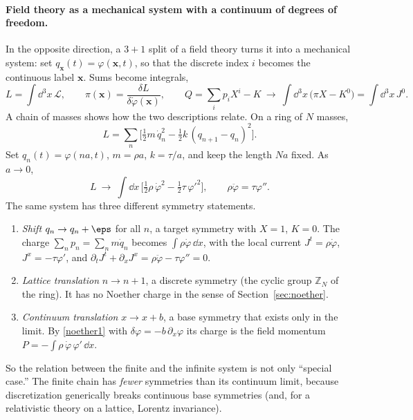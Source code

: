 \paragraph{Field theory as a mechanical system with a continuum of degrees of
freedom.}
In the opposite direction, a $3{+}1$ split of a field theory turns it into a
mechanical system: set $q_{{\bm{x}}}(t)=\varphi({\bm{x}},t)$, so that the discrete index
$i$ becomes the continuous label ${\bm{x}}$. Sums become integrals,
\begin{equation}
  L=\int\dd^3x\,\mathcal L,\qquad
  \pi({\bm{x}})=\frac{\delta L}{\delta\dot\varphi({\bm{x}})},\qquad
  Q=\sum_ip_iX^i-K\ \longrightarrow\ \int\dd^3x\,\big(\pi X-K^0\big)=\int\dd^3x\,J^0 .
\end{equation}
A chain of masses shows how the two descriptions relate. On a ring of $N$
masses,
\begin{equation}
  L=\sum_{n}\Big[\tfrac12m\,\dot q_n^2-\tfrac12k\,(q_{n+1}-q_n)^2\Big].
\end{equation}
Set $q_n(t)=\varphi(na,t)$, $m=\rho a$, $k=\tau/a$, and keep the length $Na$
fixed. As $a\to0$,
\begin{equation}
  L\ \to\ \int\dd x\,\Big[\tfrac12\rho\,\dot\varphi^2-\tfrac12\tau\,\varphi'^2\Big],
  \qquad\rho\ddot\varphi=\tau\varphi'' .
\end{equation}
The same system has three different symmetry statements.
\begin{enumerate}[leftmargin=1.8em,itemsep=3pt,label=\textbf{\arabic*.}]
\item \emph{Shift} $q_n\to q_n+\eps$ for all $n$, a target symmetry with $X=1$,
  $K=0$. The charge $\sum_np_n=\sum_nm\dot q_n$ becomes $\int\rho\dot\varphi\,\dd x$,
  with the local current $J^t=\rho\dot\varphi$, $J^x=-\tau\varphi'$, and
  $\partial_tJ^t+\partial_xJ^x=\rho\ddot\varphi-\tau\varphi''=0$.
\item \emph{Lattice translation} $n\to n+1$, a discrete symmetry (the cyclic group
  $\mathbb Z_N$ of the ring). It has no Noether charge in the sense of
  Section~\ref{sec:noether}.
\item \emph{Continuum translation} $x\to x+b$, a base symmetry that exists only
  in the limit. By \eqref{noether1} with $\delta\varphi=-b\,\partial_x\varphi$
  its charge is the field momentum $P=-\int\rho\,\dot\varphi\,\varphi'\,\dd x$.
\end{enumerate}
So the relation between the finite and the infinite system is not only
``special case.'' The finite chain has \emph{fewer} symmetries than its
continuum limit, because discretization generically breaks continuous base
symmetries (and, for a relativistic theory on a lattice, Lorentz invariance).

